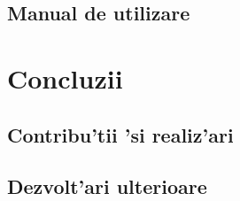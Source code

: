 \documentclass[12pt,a4paper,twoside]{report}
\begin{document}
\section{Manual de utilizare}



\chapter{Concluzii}

\section{Contribu'tii 'si realiz'ari}
\section{Dezvolt'ari ulterioare}


 


\end{document}
